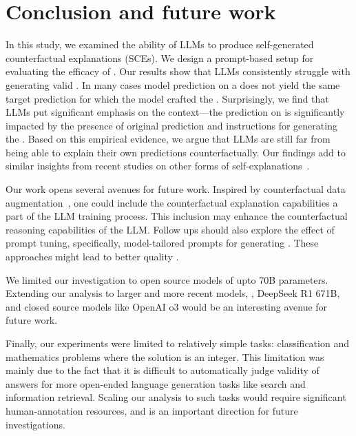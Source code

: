 \section{Conclusion and future work}
In this study, we examined the ability of LLMs to produce self-generated counterfactual explanations (SCEs).
We design a prompt-based setup for evaluating the efficacy of \SCEs.
Our results show that LLMs consistently struggle with generating valid \SCEs. In many cases model prediction on a \SCE does not yield the same target prediction for which the model crafted the \SCE.
Surprisingly, we find that LLMs put significant emphasis on the context---the prediction on \SCE is significantly impacted by the presence of original prediction and instructions for generating the \SCE.
Based on this empirical evidence, we argue that LLMs are still far from being able to explain their own predictions counterfactually.
Our findings add to similar insights from recent studies on other forms of self-explanations~\cite{lanham2023measuring,tanneru2024quantifying}.



Our work opens several avenues for future work. Inspired by counterfactual data augmentation~\cite{sachdeva2023catfood}, one could include the counterfactual explanation capabilities a part of the LLM training process. This inclusion may enhance the counterfactual reasoning capabilities of the LLM. Follow ups should also explore the effect of prompt tuning, specifically, model-tailored prompts for generating \SCEs. These approaches might lead to better quality \SCEs.


We limited our investigation to open source models of upto 70B parameters. Extending our analysis to larger and more recent models, \eg, DeepSeek R1 671B, and closed source models like OpenAI o3 would be an interesting avenue for future work.

Finally, our experiments were limited to relatively simple tasks: classification and mathematics problems where the solution is an integer. This limitation was mainly due to the fact that it is difficult to automatically judge validity of answers for more open-ended language generation tasks like search and information retrieval. Scaling our analysis to such tasks would require significant human-annotation resources, and is an important direction for future investigations.
